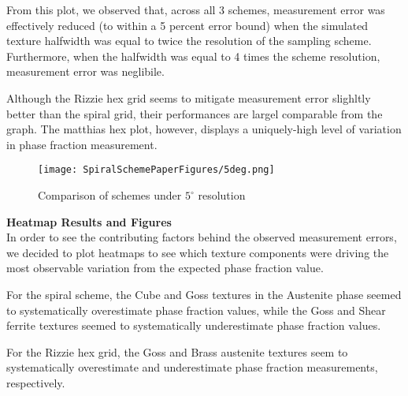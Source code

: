 \documentclass{article}
\begin{document}
From this plot, we observed that, across all 3 schemes, measurement error was effectively reduced (to within a 5 percent error bound) when the simulated texture halfwidth was equal to twice the resolution of the sampling scheme. Furthermore, when the halfwidth was equal to 4 times the scheme resolution, measurement error was neglibile.

Although the Rizzie hex grid seems to mitigate measurement error slighltly better than the spiral grid, their performances are largel comparable from the graph. The matthias hex plot, however, displays a uniquely-high level of variation in phase fraction measurement.



\begin{figure}[H]
    \centering
    \texttt{[image: SpiralSchemePaperFigures/5deg.png]}
    \caption{Comparison of schemes under $5^\circ$ resolution}
    \label{SchemeCompare5Deg}
\end{figure}


\textbf{Heatmap Results and Figures}\\
    
In order to see the contributing factors behind the observed measurement errors, we decided to plot heatmaps to see which texture components were driving the most observable variation from the expected phase fraction value.

For the spiral scheme, the Cube and Goss textures in the Austenite phase seemed to systematically overestimate phase fraction values, while the Goss and Shear ferrite textures seemed to systematically underestimate phase fraction values.

For the Rizzie hex grid, the Goss and Brass austenite textures seem to systematically overestimate and underestimate phase fraction measurements, respectively.
\end{document}
